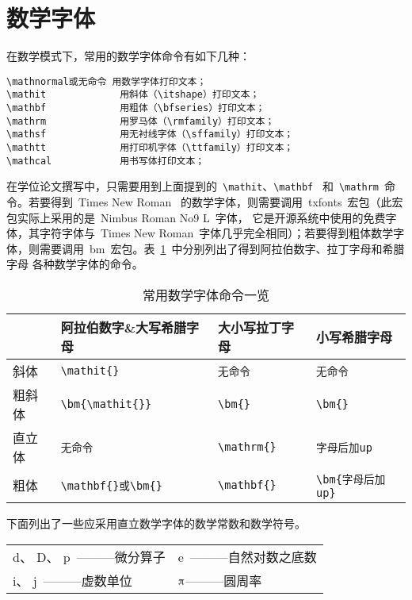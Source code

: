 \section{数学字体}
在数学模式下，常用的数学字体命令有如下几种：

\begin{verbatim}
\mathnormal或无命令 用数学字体打印文本；
\mathit             用斜体（\itshape）打印文本；
\mathbf             用粗体（\bfseries）打印文本；
\mathrm             用罗马体（\rmfamily）打印文本；
\mathsf             用无衬线字体（\sffamily）打印文本；
\mathtt             用打印机字体（\ttfamily）打印文本；
\mathcal            用书写体打印文本；
\end{verbatim}

在学位论文撰写中，只需要用到上面提到的~\verb|\mathit|、\verb|\mathbf|~ 和~\verb|\mathrm|~命令。若要得到~Times New Roman~ 的数学字体，则需要调用~txfonts~宏包（此宏包实际上采用的是~Nimbus Roman No9 L~字体，
它是开源系统中使用的免费字体，其字符字体与~Times New Roman~字体几乎完全相同）；若要得到粗体数学字体，则需要调用~bm~宏包。表~\ref{tab:fonts}~中分别列出了得到阿拉伯数字、拉丁字母和希腊字母
各种数学字体的命令。

\begin{table}[htbp]
\caption{常用数学字体命令一览}\label{tab:fonts}
\vspace{0.5em}\centering\wuhao
\begin{tabular}{llll}
\toprule
 & 阿拉伯数字\&大写希腊字母 & 大小写拉丁字母 & 小写希腊字母  \\
\midrule
斜体 & \verb|\mathit{}| & \verb|无命令| & \verb|无命令|\\
粗斜体 & \verb|\bm{\mathit{}}| & \verb|\bm{}| & \verb|\bm{}|\\
直立体 & \verb|无命令| & \verb|\mathrm{}| & \verb|字母后加up|\\
粗体 & \verb|\mathbf{}或\bm{}| & \verb|\mathbf{}| & \verb|\bm{字母后加up}|\\
\bottomrule
\end{tabular}
\vspace{\baselineskip}
\end{table}

\noindent 下面列出了一些应采用直立数学字体的数学常数和数学符号。

\vspace{-0.5em}\begin{center}\begin{tabularx}{0.7\textwidth}{XX}
$\mathrm{d}$、 $\mathrm{D}$、 $\mathrm{p}$~———微分算子 & $\mathrm{e}$~———自然对数之底数\\
$\mathrm{i}$、 $\mathrm{j}$~———虚数单位 & $\piup$———圆周率\\
\end{tabularx}\end{center}

